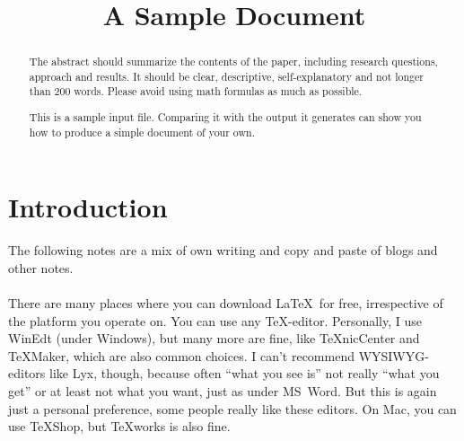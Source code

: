 \documentclass[aodsor,preprint]{imsart}
\numberwithin{equation}{section}
\theoremstyle{plain}
\begin{document}
\begin{frontmatter}
\title{A Sample Document}


\begin{abstract}
The abstract should summarize the contents of the paper, including research questions, approach and results.
It should be clear, descriptive, self-explanatory and not longer
than 200 words. Please avoid using math formulas as much as possible.

This is a sample input file.  Comparing it with the output it
generates can show you how to produce a simple document of
your own.
\end{abstract}

\begin{keyword}[class=MSC]
\end{keyword}

\begin{keyword}
\kwd{\LaTeXe}
\end{keyword}

\end{frontmatter}

\section{Introduction}


The following notes are a mix of own writing and copy and paste of blogs and other notes.\\
\\
There are many places where you can download \LaTeX\ for free, irrespective of the platform you operate on. You can use any \TeX-editor. Personally, I use \textmd{WinEdt} (under Windows), but many more are fine, like \TeX nicCenter and \TeX Maker, which are also common choices. I can't recommend WYSIWYG-editors like Lyx, though, because often ``what you see is'' not really ``what you get'' or at least not what you want, just as under MS~Word. But this is again just a personal preference, some people really like these editors. On Mac, you can use \TeX Shop, but \TeX works is also fine.
\end{document}
